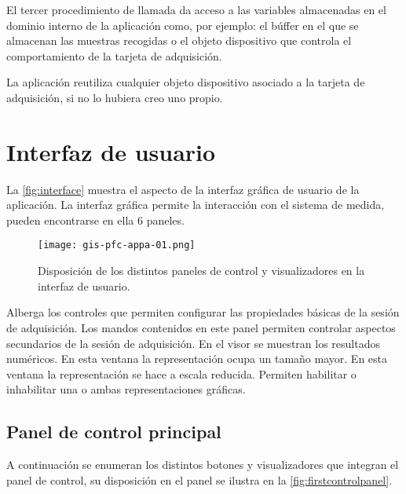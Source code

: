 El tercer procedimiento de llamada da acceso a las variables almacenadas en
el dominio interno de la aplicación como, por ejemplo: el búffer en el que se
almacenan las muestras recogidas o el objeto dispositivo que controla el
comportamiento de la tarjeta de adquisición.

La aplicación reutiliza cualquier objeto dispositivo asociado a la tarjeta
de adquisición, si no lo hubiera creo uno propio.


\section{Interfaz de usuario}

La \vref{fig:interface} muestra el aspecto de la interfaz gráfica de
usuario de la aplicación. La interfaz gráfica permite la interacción con el
sistema de medida, pueden encontrarse en ella 6 paneles.

\begin{figure}
    \begin{center}
	\texttt{[image: gis-pfc-appa-01.png]}
    \end{center}
    \caption[Aspecto de la interfaz de usuario]{Disposición de los
	distintos paneles de control y visualizadores en la interfaz de
	usuario.}
    \label{fig:interface}
\end{figure}

\begin{enumerate}
     Alberga los controles que
	permiten configurar las propiedades básicas de la sesión de
	adquisición.
     Los mandos contenidos en
	este panel permiten controlar aspectos secundarios de la sesión de
	adquisición.
     En el visor se muestran los resultados
	numéricos.
     En esta ventana la
	representación ocupa un tamaño mayor.
     En esta ventana la
	representación se hace a escala reducida.
     Permiten habilitar o inhabilitar una o
	ambas representaciones gráficas.
\end{enumerate}


\subsection{Panel de control principal}

A continuación se enumeran los distintos botones y visualizadores que
integran el panel de control, su disposición en el panel se ilustra en la
\vref{fig:firstcontrolpanel}.

